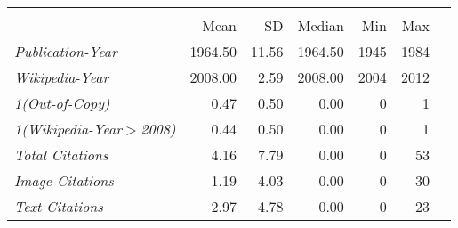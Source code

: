 {
\def\sym#1{\ifmmode^{#1}\else\(^{#1}\)\fi}
\begin{tabular*}{\hsize}{@{\hskip\tabcolsep\extracolsep\fill}l*{1}{rrrrrr}}
\toprule
                              &\multicolumn{5}{c}{}                                            \\
                              &        Mean&          SD&      Median&         Min&         Max\\
\midrule
\emph{Publication-Year}       &     1964.50&       11.56&     1964.50&        1945&        1984\\
\emph{Wikipedia-Year}         &     2008.00&        2.59&     2008.00&        2004&        2012\\
\emph{1(Out-of-Copy)}         &        0.47&        0.50&        0.00&           0&           1\\
\emph{1(Wikipedia-Year$>$2008)}&        0.44&        0.50&        0.00&           0&           1\\
\emph{Total Citations}        &        4.16&        7.79&        0.00&           0&          53\\
\emph{Image Citations}        &        1.19&        4.03&        0.00&           0&          30\\
\emph{Text Citations}         &        2.97&        4.78&        0.00&           0&          23\\
\bottomrule
\end{tabular*}
}

